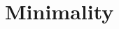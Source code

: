 \documentclass[hidelinks]{article}
\newcommand{\Lc}{\mathcal{L}}  %
\newcommand{\Gc}{\mathcal{G}}  %
\newcommand{\Hc}{\mathcal{H}}  %
\newcommand{\Bc}{\mathcal{B}}
\newcommand{\GtH}{{\Gc^\to\Hc}}
\newcommand{\shift}[1]{\mathsf{X}_{#1}}
\theoremstyle{definition}
\begin{document}

    





\newpage

\section{Minimality}
\end{document}
